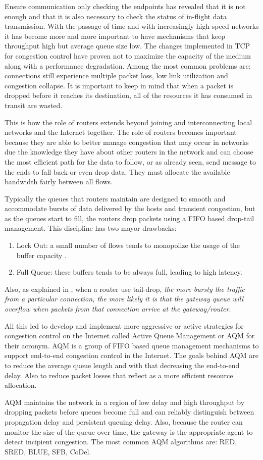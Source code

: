Ensure communication only checking the endpoints has revealed that it is not
enough and that it is also necessary to check the status of in-flight data
transmission. With the passage of time and with increasingly high speed
networks it has become more and more important to have mechanisms that keep
throughput high but average queue size low. The changes implemented in TCP for
congestion control have proven not to maximize the capacity of the medium
along with a performance degradation. Among the most common problems are:
connections still experience multiple packet loss, low link utilization and
congestion collapse. It is important to keep in mind that when a packet is
dropped before it reaches its destination, all of the resources it has
consumed in transit are wasted.

This is how the role of routers extends beyond joining and interconnecting local
networks and the Internet together. The role of routers becomes important
because they are able to better manage congestion that may occur in networks
due the knowledge they have about other routers in the network and can choose
the most efficient path for the data to follow, or as already seen, send
message to the ends to fall back or even drop data.  They must allocate
the available bandwidth fairly between all flows.

Typically the queues that routers maintain are designed to smooth and
accommodate bursts of data delivered by the hosts and transient congestion,
but as the queues start to fill, the routers drop packets using a FIFO based
drop-tail management. This discipline has two mayor drawbacks:
\begin{enumerate}
\item Lock Out: a small number of flows tends to monopolize the usage of the
buffer capacity\cite{evolvshortlongflows} .
\item Full Queue: these buffers tends to be always full, leading to 
high latency.
\end{enumerate}

Also, as explained in \cite{FloydJacobsonRED}, when a router use tail-drop,
\emph{the more bursty the traffic from a particular connection, the more
likely it is that the gateway queue will overflow when packets from that
connection arrive at the gateway/router}.

All this led to develop and implement more aggressive or active strategies for
congestion control on the Internet called Active Queue Management or AQM for
their acronym. AQM is a group of FIFO based queue management mechanisms to
support end-to-end congestion control in the Internet. The goals behind AQM
are to reduce the average queue length and with that decreasing the end-to-end
delay. Also to reduce packet losses that reflect as a more efficient resource
allocation.

AQM maintains the network in a region of low delay and high throughput by
dropping packets before queues become full and can reliably distinguish
between propagation delay and persistent queuing delay. Also, because the
router can monitor the size of the queue over time, the gateway is the
appropriate agent to detect incipient congestion. The most common AQM
algorithms are: RED, SRED, BLUE, SFB, CoDel.
